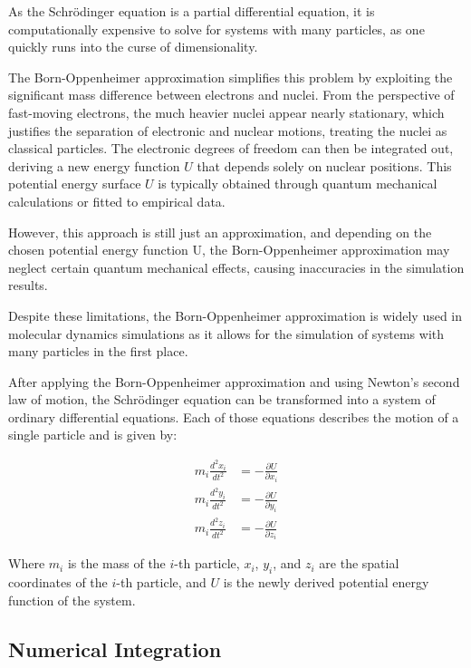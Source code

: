 As the Schrödinger equation is a partial differential equation, it is computationally expensive to solve for systems with many particles, as one quickly runs into the curse of dimensionality.

The Born-Oppenheimer approximation simplifies this problem by exploiting the significant mass difference between electrons and nuclei. From the perspective of fast-moving electrons, the much heavier nuclei appear nearly stationary, which justifies the separation of electronic and nuclear motions, treating the nuclei as classical particles. The electronic degrees of freedom can then be integrated out, deriving a new energy function $U$ that depends solely on nuclear positions.
This potential energy surface $U$ is typically obtained through quantum mechanical calculations or fitted to empirical data.

However, this approach is still just an approximation, and depending on the chosen potential energy function U, the Born-Oppenheimer approximation may neglect certain quantum mechanical effects, causing inaccuracies in the simulation results.


Despite these limitations, the Born-Oppenheimer approximation is widely used in molecular dynamics simulations as it allows for the simulation of systems with many particles in the first place.

After applying the Born-Oppenheimer approximation and using Newton's second law of motion, the Schrödinger equation can be transformed into a system of ordinary differential equations. Each of those equations describes the motion of a single particle and is given by:

\begin{align}
      m_i \frac{d^2 x_i}{dt^2} & = -\frac{\partial U}{\partial x_i} \\
      m_i \frac{d^2 y_i}{dt^2} & = -\frac{\partial U}{\partial y_i} \\
      m_i \frac{d^2 z_i}{dt^2} & = -\frac{\partial U}{\partial z_i}
\end{align}

Where $m_i$ is the mass of the $i$-th particle, $x_i$, $y_i$, and $z_i$ are the spatial coordinates of the $i$-th particle, and $U$ is the newly derived potential energy function of the system.

\subsection{Numerical Integration}

